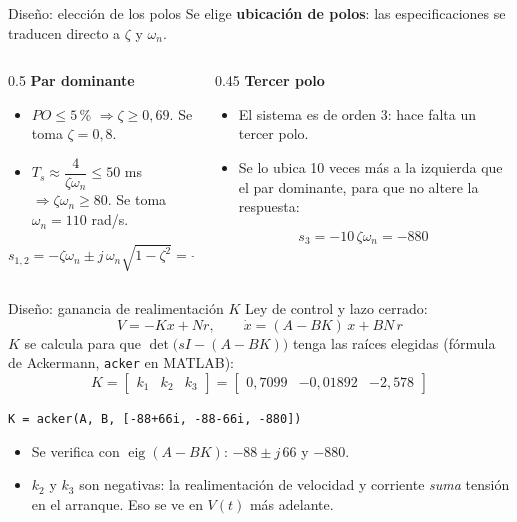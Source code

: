 \documentclass[11pt,aspectratio=169]{beamer}
\begin{document}
\begin{frame}{Diseño: elección de los polos}
  Se elige \textbf{ubicación de polos}: las especificaciones se traducen directo a $\zeta$ y $\omega_n$.

  \vspace{0.6em}
  \begin{columns}[T]
    \begin{column}{0.5\textwidth}
      \textbf{Par dominante}
      \begin{itemize}
        \item $PO \le 5$\,\% $\Rightarrow \zeta \ge 0{,}69$. Se toma $\zeta = 0{,}8$.
        \item $T_s \approx \dfrac{4}{\zeta\omega_n} \le 50$ ms $\Rightarrow \zeta\omega_n \ge 80$. Se toma $\omega_n = 110$ rad/s.
      \end{itemize}
      \[
        s_{1,2} = -\zeta\omega_n \pm j\,\omega_n\sqrt{1-\zeta^2} = -88 \pm j\,66
      \]
    \end{column}
    \begin{column}{0.45\textwidth}
      \textbf{Tercer polo}
      \begin{itemize}
        \item El sistema es de orden 3: hace falta un tercer polo.
        \item Se lo ubica 10 veces más a la izquierda que el par dominante, para que no altere la respuesta:
      \end{itemize}
      \[
        s_3 = -10\,\zeta\omega_n = -880
      \]
    \end{column}
  \end{columns}
\end{frame}

\begin{frame}{Diseño: ganancia de realimentación $K$}
  Ley de control y lazo cerrado:
  \[
    V = -Kx + N r,\qquad \dot x = (A-BK)\,x + BN\,r
  \]
  $K$ se calcula para que $\det\big(sI-(A-BK)\big)$ tenga las raíces elegidas
  (fórmula de Ackermann, \texttt{acker} en MATLAB):
  \[
    K = \begin{bmatrix}k_1 & k_2 & k_3\end{bmatrix} = \begin{bmatrix}0{,}7099 & -0{,}01892 & -2{,}578\end{bmatrix}
  \]
  \centerline{\small\texttt{K = acker(A, B, [-88+66i, -88-66i, -880])}}
  \begin{itemize}
    \item Se verifica con $\operatorname{eig}(A-BK)$: $-88\pm j\,66$ y $-880$.
    \item $k_2$ y $k_3$ son negativas: la realimentación de velocidad y corriente \emph{suma} tensión
          en el arranque. Eso se ve en $V(t)$ más adelante.
  \end{itemize}
\end{frame}
\end{document}
